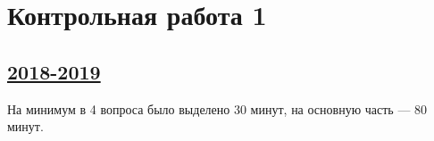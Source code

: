\newpage
\thispagestyle{empty}
\section{Контрольная работа 1}


\subsection[2018-2019]{\hyperref[sec:sol_kr_01_2018_2019]{2018-2019}}
\label{sec:kr_01_2018_2019} %

На минимум в 4 вопроса было выделено 30 минут, на основную часть — 80 минут.

